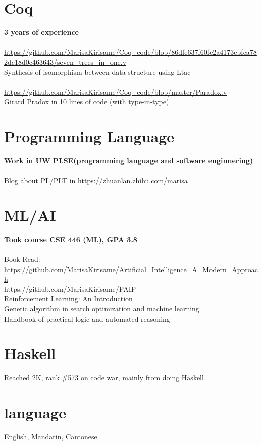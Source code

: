\documentclass[margin,line]{res}
\begin{document}
\begin{resume}
\section{\sc Coq} 
\textbf{3 years of experience} \\
\\
\url{https://github.com/MarisaKirisame/Coq_code/blob/86dfe637f60fe2a4173ebfca782de18d0c463643/seven_trees_in_one.v} \\
Synthesis of isomorphism between data structure using Ltac \\
\\
\url{https://github.com/MarisaKirisame/Coq_code/blob/master/Paradox.v} \\
Girard Pradox in 10 lines of code (with type-in-type)

\section{\sc Programming Language}
\textbf{Work in UW PLSE(programming language and software enginnering)} \\
\\
Blog about PL/PLT in https://zhuanlan.zhihu.com/marisa

\section{ML/AI}
\textbf{Took course CSE 446 (ML), GPA 3.8} \\
\\
Book Read: \\
\url{https://github.com/MarisaKirisame/Artificial_Intelligence_A_Modern_Approach} \\
https://github.com/MarisaKirisame/PAIP \\
Reinforcement Learning: An Introduction \\
Genetic algorithm in search optimization and machine learning \\
Handbook of practical logic and automated reasoning

\section{\sc Haskell} Reached 2K, rank \#573 on code war, mainly from doing Haskell

\section{\sc language} English, Mandarin, Cantonese

\vspace*{-.2in}

\end{resume}
\end{document}
